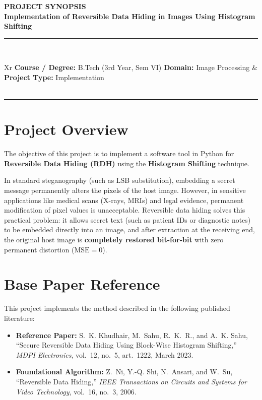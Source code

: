 \documentclass[10pt,a4paper]{article}
\begin{document}
\pagestyle{empty}

\begin{center}
    {\large \textbf{PROJECT SYNOPSIS}}\\[0.2em]
    {\large \textbf{Implementation of Reversible Data Hiding in Images Using Histogram Shifting}}\\[0.3em]
    \rule{\textwidth}{0.8pt}\\[0.3em]
    \footnotesize
    \begin{tabularx}{\textwidth}{Xr}
        \textbf{Course / Degree:} B.Tech (3rd Year, Sem VI) \quad \textbar \quad \textbf{Domain:} Image Processing & \textbf{Project Type:} Implementation \\
         \\
    \end{tabularx}
    \rule{\textwidth}{0.8pt}
\end{center}

\vspace{-0.4em}

\section{Project Overview}
The objective of this project is to implement a software tool in Python for \textbf{Reversible Data Hiding (RDH)} using the \textbf{Histogram Shifting} technique. 

In standard steganography (such as LSB substitution), embedding a secret message permanently alters the pixels of the host image. However, in sensitive applications like medical scans (X-rays, MRIs) and legal evidence, permanent modification of pixel values is unacceptable. Reversible data hiding solves this practical problem: it allows secret text (such as patient IDs or diagnostic notes) to be embedded directly into an image, and after extraction at the receiving end, the original host image is \textbf{completely restored bit-for-bit} with zero permanent distortion ($\text{MSE} = 0$).

\section{Base Paper Reference}
This project implements the method described in the following published literature:
\begin{itemize}[leftmargin=1.2em, itemsep=1pt, topsep=1pt, parsep=0pt]
    \footnotesize
    \item \textbf{Reference Paper:} S.~K. Khudhair, M.~Sahu, R.~K.~R., and A.~K. Sahu, ``Secure Reversible Data Hiding Using Block-Wise Histogram Shifting,'' \textit{MDPI Electronics}, vol.~12, no.~5, art.~1222, March 2023.
    \item \textbf{Foundational Algorithm:} Z.~Ni, Y.-Q. Shi, N.~Ansari, and W.~Su, ``Reversible Data Hiding,'' \textit{IEEE Transactions on Circuits and Systems for Video Technology}, vol.~16, no.~3, 2006.
\end{itemize}
\end{document}
